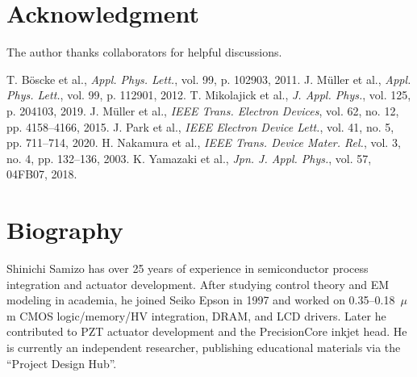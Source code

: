 \documentclass[conference]{IEEEtran}
\begin{document}
\section*{Acknowledgment}
The author thanks collaborators for helpful discussions.

\begin{thebibliography}{1}
 T. Böscke et al., \textit{Appl. Phys. Lett.}, vol. 99, p. 102903, 2011.
 J. Müller et al., \textit{Appl. Phys. Lett.}, vol. 99, p. 112901, 2012.
 T. Mikolajick et al., \textit{J. Appl. Phys.}, vol. 125, p. 204103, 2019.
 J. Müller et al., \textit{IEEE Trans. Electron Devices}, vol. 62, no. 12, pp. 4158--4166, 2015.
 J. Park et al., \textit{IEEE Electron Device Lett.}, vol. 41, no. 5, pp. 711--714, 2020.
 H. Nakamura et al., \textit{IEEE Trans. Device Mater. Rel.}, vol. 3, no. 4, pp. 132--136, 2003.
 K. Yamazaki et al., \textit{Jpn. J. Appl. Phys.}, vol. 57, 04FB07, 2018.
\end{thebibliography}

\section*{Biography}
Shinichi Samizo has over 25 years of experience in semiconductor process integration and actuator development. After studying control theory and EM modeling in academia, he joined Seiko Epson in 1997 and worked on 0.35--0.18~$\mu$m CMOS logic/memory/HV integration, DRAM, and LCD drivers. Later he contributed to PZT actuator development and the PrecisionCore inkjet head. He is currently an independent researcher, publishing educational materials via the ``Project Design Hub''.
\end{document}
